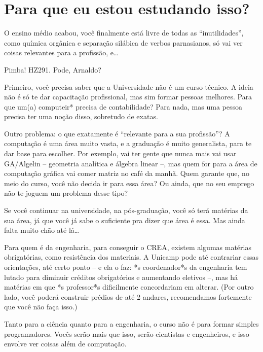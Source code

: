 
\section{Para que eu estou estudando isso?}

O ensino médio acabou, você finalmente está livre de todas as ``inutilidades'',
como química orgânica e separação silábica de verbos parnasianos, só vai ver
coisas relevantes para a profissão, e{\dots}

Pimba! HZ291. Pode, Arnaldo?

Primeiro, você precisa saber que a Universidade não é um curso técnico. A ideia
não é só te dar capacitação profissional, mas sim formar pessoas melhores. Para
que um(a) computeir* precisa de contabilidade? Para nada, mas uma pessoa
precisa ter uma noção disso, sobretudo de exatas.

Outro problema: o que exatamente é ``relevante para a sua profissão''?  A
computação é uma área muito vasta, e a graduação é muito generalista, para te
dar base para escolher. Por exemplo, vai ter gente que nunca mais vai usar
GA/Algelin -- geometria analítica e álgebra linear --, mas quem for para a área
de computação gráfica vai comer matriz no café da manhã. Quem garante que, no
meio do curso, você não decida ir para essa área? Ou ainda, que no seu emprego
não te joguem um problema desse tipo?

Se você continuar na universidade, na pós-graduação, você só terá matérias da
sua área, já que você já sabe o suficiente pra dizer que área é essa. Mas ainda
falta muito chão até lá{\dots}

Para quem é da engenharia, para conseguir o CREA, existem algumas matérias
obrigatórias, como resistência dos materiais. A Unicamp pode até contrariar
essas orientações, até certo ponto -- e ela o faz: *s coordenador*s da
engenharia tem lutado para diminuir créditos obrigatórios e aumentando
eletivos --, mas há matérias em que *s professor*s dificilmente concordariam
em alterar. (Por outro lado, você poderá construir prédios de até 2 andares,
recomendamos fortemente que você não faça isso.)

Tanto para a ciência quanto para a engenharia, o curso não é para formar
simples programadores. Vocês serão mais que isso, serão cientistas e
engenheiros, e isso envolve ver coisas além de computação.
